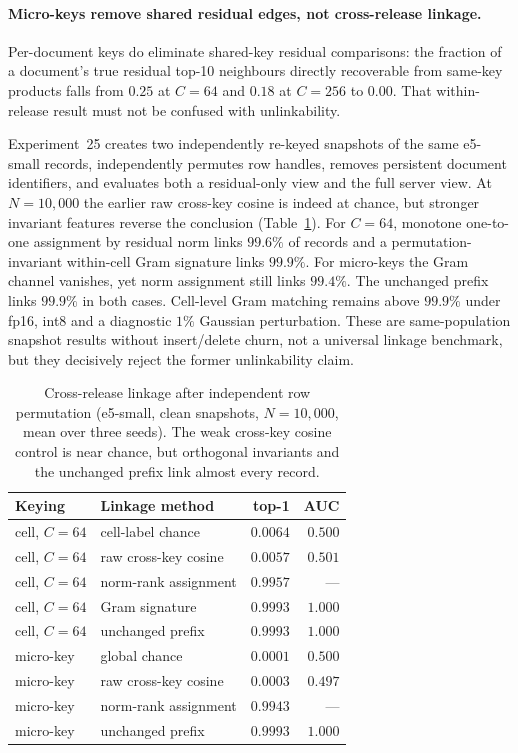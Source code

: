 \documentclass[11pt,a4paper]{article}
\begin{document}
\paragraph{Micro-keys remove shared residual edges, not cross-release linkage.}\label{ssec:shard-micro}

Per-document keys do eliminate shared-key residual comparisons: the fraction
of a document's true residual top-10 neighbours directly recoverable from
same-key products falls from $0.25$ at $C{=}64$ and $0.18$ at $C{=}256$ to
$0.00$. That within-release result must not be confused with unlinkability.

Experiment~25 creates two independently re-keyed snapshots of the same
e5-small records, independently permutes row handles, removes persistent
document identifiers, and evaluates both a residual-only view and the full
server view. At $N=10{,}000$ the earlier raw cross-key cosine is indeed at
chance, but stronger invariant features reverse the conclusion
(Table~\ref{tab:shard-micro}). For $C{=}64$, monotone one-to-one assignment
by residual norm links $99.6\%$ of records and a permutation-invariant
within-cell Gram signature links $99.9\%$. For micro-keys the Gram channel
vanishes, yet norm assignment still links $99.4\%$. The unchanged prefix
links $99.9\%$ in both cases. Cell-level Gram matching remains above $99.9\%$
under fp16, int8 and a diagnostic $1\%$ Gaussian perturbation. These are
same-population snapshot results without insert/delete churn, not a universal
linkage benchmark, but they decisively reject the former unlinkability claim.

\begin{table}[tbp]
\centering
\caption{Cross-release linkage after independent row permutation
(e5-small, clean snapshots, $N=10{,}000$, mean over three seeds). The weak
cross-key cosine control is near chance, but orthogonal invariants and the
unchanged prefix link almost every record.}
\label{tab:shard-micro}
\small
\begin{tabular}{@{}llrr@{}}
\toprule
Keying & Linkage method & top-1 & AUC \\ \midrule
cell, $C{=}64$ & cell-label chance & $0.0064$ & $0.500$ \\
cell, $C{=}64$ & raw cross-key cosine & $0.0057$ & $0.501$ \\
cell, $C{=}64$ & norm-rank assignment & $0.9957$ & --- \\
cell, $C{=}64$ & Gram signature & $0.9993$ & $1.000$ \\
cell, $C{=}64$ & unchanged prefix & $0.9993$ & $1.000$ \\ \midrule
micro-key & global chance & $0.0001$ & $0.500$ \\
micro-key & raw cross-key cosine & $0.0003$ & $0.497$ \\
micro-key & norm-rank assignment & $0.9943$ & --- \\
micro-key & unchanged prefix & $0.9993$ & $1.000$ \\
\bottomrule
\end{tabular}
\end{table}
\end{document}
